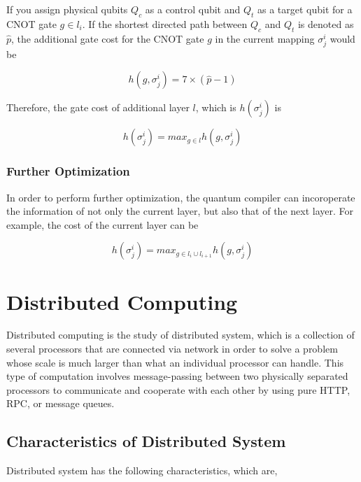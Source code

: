If you assign physical qubits $Q_c$ as a control qubit and $Q_t$ as a target qubit for a CNOT gate $g \in l_i$.  If the shortest directed path between $Q_c$ and $Q_t$ is denoted as $\hat{p}$, the additional gate cost for the CNOT gate $g$ in the current mapping $\sigma^i_j$ would be 

\begin{equation}
h(g, \sigma^i_j) = 7 \times (\hat{p} - 1)
\end{equation}

Therefore, the gate cost of additional layer $l$, which is $h(\sigma^i_j)$ is

\begin{equation}
h(\sigma^i_j) = max_{g \in l} h(g, \sigma^i_j)
\end{equation}

\subsubsection{Further Optimization}

In order to perform further optimization, the quantum compiler can incoroperate the information of not only the current layer, but also that of the next layer.  For example, the cost of the current layer can be

\begin{equation} 
h(\sigma^i_j) = max_{g \in l_i \cup l_{i+1}} h(g, \sigma^i_j)
\end{equation}

\newpage

\section{Distributed Computing}

 Distributed computing is the study of distributed system, which is a collection of several processors that are connected via network in order to solve a problem whose scale is much larger than what an individual processor can handle.  This type of computation involves message-passing between two physically separated processors to communicate and cooperate with each other by using pure HTTP, RPC, or message queues. \cite{distributedcomputingtext} 
 
 \subsection{Characteristics of Distributed System}
 \par Distributed system has the following characteristics, which are,
 
